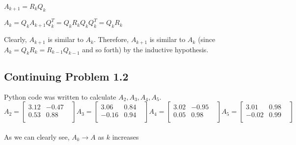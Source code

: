 \documentclass[12pt]{article}
\begin{document}
$A_{k+1} = R_kQ_k$ 

$A_k = Q_k A_{k+1} Q_k^T  =  Q_k R_kQ_k Q_k^T = Q_k R_k$

Clearly, $A_{k+1}$ is similar to $A_k$. Therefore, $A_{k+1}$ is similar to $A_k$ (since $A_k = Q_kR_k = R_{k-1}Q_{k-1}$ and so forth) by the inductive hypothesis.




\subsection{Continuing Problem  1.2}
Python code was written to calculate $A_2, A_3, A_4, A_5$. \\
$$
A_2 = \begin{bmatrix}
3.12 & -0.47 & \\
0.53 & 0.88 & \\
\end{bmatrix}
A_3 = \begin{bmatrix}
3.06 & 0.84 & \\
-0.16 & 0.94 & \\
\end{bmatrix}
A_4 = \begin{bmatrix}
3.02 & -0.95 & \\
0.05 & 0.98 & \\
\end{bmatrix}
A_5 = \begin{bmatrix}
3.01 & 0.98 & \\
-0.02 & 0.99 & \\
\end{bmatrix}
$$ \\ 

As we can clearly see, $A_k \xrightarrow{} A$ as $k$ increases


\subsection{}
\end{document}
